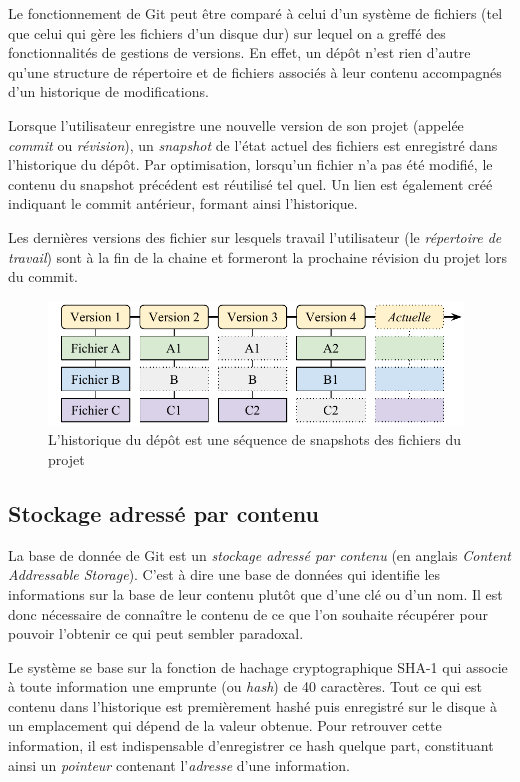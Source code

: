 \documentclass[11pt,a4paper]{article}
\begin{document}
Le fonctionnement de Git peut être comparé à celui d'un système de fichiers (tel que celui qui gère les fichiers d'un disque dur) sur lequel on a greffé des fonctionnalités de gestions de versions.
En effet, un dépôt n'est rien d'autre qu'une structure de répertoire et de fichiers associés à leur contenu accompagnés d'un historique de modifications.

Lorsque l'utilisateur enregistre une nouvelle version de son projet (appelée \textit{commit} ou \textit{révision}), un \textit{snapshot} de l'état actuel des fichiers est enregistré dans l'historique du dépôt.
Par optimisation, lorsqu'un fichier n'a pas été modifié, le contenu du snapshot précédent est réutilisé tel quel. Un lien est également créé indiquant le commit antérieur, formant ainsi l'historique.

Les dernières versions des fichier sur lesquels travail l'utilisateur (le \textit{répertoire de travail}) sont à la fin de la chaine et formeront la prochaine révision du projet lors du commit.

\begin{figure}[ht]
\begin{center}
\includegraphics[width=11cm]{img_snapshots}
\caption{L'historique du dépôt est une séquence de snapshots des fichiers du projet}
\end{center}
\end{figure}

\subsection{Stockage adressé par contenu}

La base de donnée de Git est un \textit{stockage adressé par contenu} (en anglais \textit{Content Addressable Storage}). C'est à dire une base de données qui identifie les informations sur la base de leur contenu plutôt que d'une clé ou d'un nom.
Il est donc nécessaire de connaître le contenu de ce que l'on souhaite récupérer pour pouvoir l'obtenir ce qui peut sembler paradoxal.

Le système se base sur la fonction de hachage cryptographique SHA-1 qui associe à toute information une emprunte (ou \textit{hash}) de 40 caractères.
Tout ce qui est contenu dans l'historique est premièrement hashé puis enregistré sur le disque à un emplacement qui dépend de la valeur obtenue.
Pour retrouver cette information, il est indispensable d'enregistrer ce hash quelque part, constituant ainsi un \textit{pointeur} contenant l'\textit{adresse} d'une information.
\end{document}
